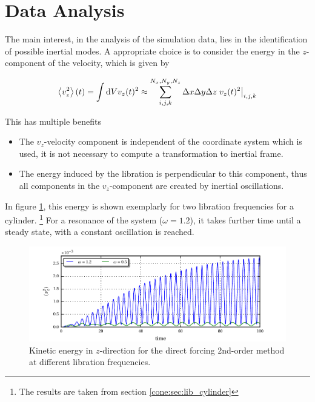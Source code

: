 \section{Data Analysis}

The main interest, in the analysis of the simulation data, lies in the identification of possible inertial modes.
A appropriate choice is to consider the energy in the $z$-component of the  velocity, which is given by

\begin{align}
    \left<v_z^2 \right>(t) =  \int \mathop{}\!\mathrm{d} V v_z(t)^2 \approx \sum_{i, j, k}^{N_x,N_y,N_z} \Delta x \Delta y \Delta z \left.v_z(t)^2 \right|_{i,j,k}
\end{align}

This has multiple benefits

\begin{itemize}
    \item The $v_z$-velocity component is independent of the coordinate system which is used, it is not necessary
                to compute a transformation to inertial frame.
    \item The energy induced by the libration is perpendicular to this component, thus all components
            in the $v_z$-component are created by inertial oscillations.
\end{itemize}

In figure \ref{fig:cone:cyl_vzmode}, this energy is shown exemplarly for two libration frequencies for a cylinder.
\footnote{The results are taken from section \ref{cone:sec:lib_cylinder}}
For a resonance of the system ($\omega=1.2$), it takes further time until a steady state, with a constant oscillation is reached.

\begin{figure}[!pb]
  \includegraphics{gfx/cone/cylinder/cyl_vz.pdf}
  \caption{Kinetic energy in $z$-direction for the direct forcing 2nd-order method at different libration frequencies.
  \label{fig:cone:cyl_vzmode}
  }
\end{figure}
\clearpage

